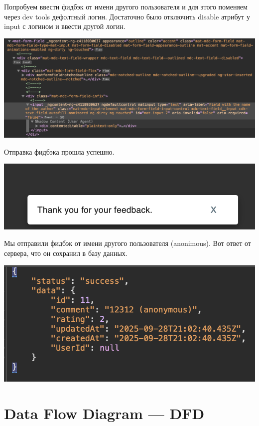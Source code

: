 \documentclass{article}
\begin{document}
Попробуем ввести фидбэк от имени другого пользователя и для этого поменяем через dev tools дефолтный логин. 
Достаточно было отключить disable атрибут у input с логином и ввести другой логин.

\begin{center}
  \includegraphics[width=.9\textwidth]{s11}
\end{center}

Отправка фидбэка прошла успешно.

\begin{center}
  \includegraphics[width=.9\textwidth]{s111}
\end{center}

Мы отправили фидбэк от имени другого пользователя (anonimous). Вот ответ от сервера, что он сохранил в базу данных.

\begin{center}
  \includegraphics[width=.9\textwidth]{s1111}
\end{center}

\section{Data Flow Diagram — DFD}
\end{document}
